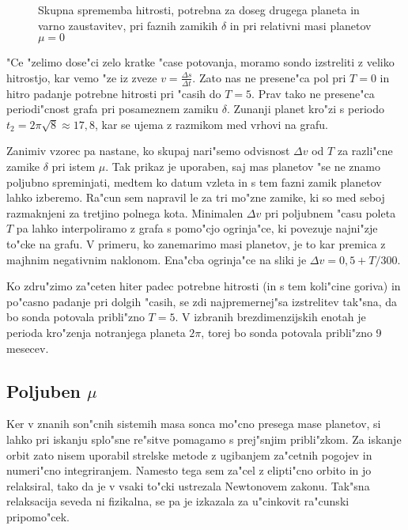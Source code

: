 \documentclass[a4paper,10pt]{article}
\begin{document}
\begin{figure}[H]
\centering
 
 \caption{Skupna sprememba hitrosti, potrebna za doseg drugega planeta in varno zaustavitev, pri faznih zamikih $\delta$ in pri relativni masi planetov $\mu=0$}
 \label{fig:hitrost-delta-0}
\end{figure}

"Ce "zelimo dose"ci zelo kratke "case potovanja, moramo sondo izstreliti z veliko hitrostjo, kar vemo "ze iz zveze $v = \frac{\Delta s}{\Delta t}$. Zato nas ne presene"ca pol pri $T=0$ in hitro padanje potrebne hitrosti pri "casih do $T=5$. Prav tako ne presene"ca periodi"cnost grafa pri posameznem zamiku $\delta$. Zunanji planet kro"zi s periodo $t_2 = 2\pi\sqrt{8} \approx 17,8$, kar se ujema z razmikom med vrhovi na grafu.

Zanimiv vzorec pa nastane, ko skupaj nari"semo odvisnost $\Delta v$ od $T$ za razli"cne zamike $\delta$ pri istem $\mu$. Tak prikaz je uporaben, saj mas planetov "se ne znamo poljubno spreminjati, medtem ko datum vzleta in s tem fazni zamik planetov lahko izberemo. Ra"cun sem napravil le za tri mo"zne zamike, ki so med seboj razmaknjeni za tretjino polnega kota. Minimalen $\Delta v$ pri poljubnem "casu poleta $T$ pa lahko interpoliramo z grafa s pomo"cjo ogrinja"ce, ki povezuje najni"zje to"cke na grafu. V primeru, ko zanemarimo masi planetov, je to kar premica z majhnim negativnim naklonom. Ena"cba ogrinja"ce na sliki je $\Delta v = 0,\!5 + T/300$. 

Ko zdru"zimo za"ceten hiter padec potrebne hitrosti (in s tem koli"cine goriva) in po"casno padanje pri dolgih "casih, se zdi najpremernej"sa izstrelitev tak"sna, da bo sonda potovala pribli"zno $T=5$. V izbranih brezdimenzijskih enotah je perioda kro"zenja notranjega planeta $2\pi$, torej bo sonda potovala pribli"zno 9 mesecev. 

\subsection{Poljuben $\mu$}

Ker v znanih son"cnih sistemih masa sonca mo"cno presega mase planetov, si lahko pri iskanju splo"sne re"sitve pomagamo s prej"snjim pribli"zkom. Za iskanje orbit zato nisem uporabil strelske metode z ugibanjem za"cetnih pogojev in numeri"cno integriranjem. Namesto tega sem za"cel z elipti"cno orbito in jo relaksiral, tako da je v vsaki to"cki ustrezala Newtonovem zakonu. Tak"sna relaksacija seveda ni fizikalna, se pa je izkazala za u"cinkovit ra"cunski pripomo"cek. 
\end{document}
